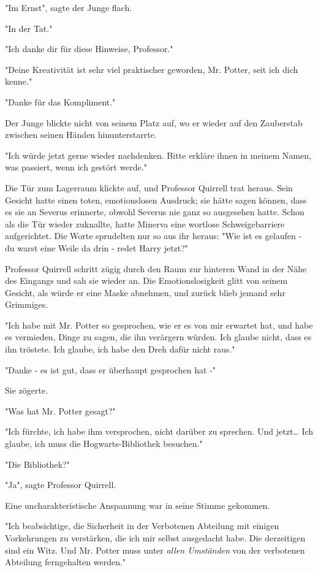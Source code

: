 {"Im Ernst", sagte der Junge flach.

"In der Tat."

"Ich danke dir für diese Hinweise, Professor."

"Deine Kreativität ist sehr viel praktischer geworden, Mr. Potter, seit ich dich kenne."

"Danke für das Kompliment."

Der Junge blickte nicht von seinem Platz auf, wo er wieder auf den Zauberstab zwischen seinen Händen hinunterstarrte.

"Ich würde jetzt gerne wieder nachdenken. Bitte erkläre ihnen in meinem Namen, was passiert, wenn ich gestört werde."

Die Tür zum Lagerraum klickte auf, und Professor Quirrell trat heraus. Sein Gesicht hatte einen toten, emotionslosen Ausdruck; sie hätte sagen können, dass es sie an Severus erinnerte, obwohl Severus nie ganz so ausgesehen hatte. Schon als die Tür wieder zuknallte, hatte Minerva eine wortlose Schweigebarriere aufgerichtet. Die Worte sprudelten nur so aus ihr heraus: "Wie ist es gelaufen - du warst eine Weile da drin - redet Harry jetzt?"

Professor Quirrell schritt zügig durch den Raum zur hinteren Wand in der Nähe des Eingangs und sah sie wieder an. Die Emotionslosigkeit glitt von seinem Gesicht, als würde er eine Maske abnehmen, und zurück blieb jemand sehr Grimmiges.

"Ich habe mit Mr. Potter so gesprochen, wie er es von mir erwartet hat, und habe es vermieden, Dinge zu sagen, die ihn verärgern würden. Ich glaube nicht, dass es ihn tröstete. Ich glaube, ich habe den Dreh dafür nicht raus."

"Danke - es ist gut, dass er überhaupt gesprochen hat -"

Sie zögerte.

"Was hat Mr. Potter gesagt?"

"Ich fürchte, ich habe ihm versprochen, nicht darüber zu sprechen. Und jetzt… Ich glaube, ich muss die Hogwarts-Bibliothek besuchen."

"Die Bibliothek?"

"Ja", sagte Professor Quirrell.

Eine uncharakteristische Anspannung war in seine Stimme gekommen.

"Ich beabsichtige, die Sicherheit in der Verbotenen Abteilung mit einigen Vorkehrungen zu verstärken, die ich mir selbst ausgedacht habe. Die derzeitigen sind ein Witz. Und Mr. Potter muss unter \emph{allen Umständen} von der verbotenen Abteilung ferngehalten werden."

}
